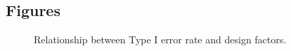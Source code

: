 \documentclass[twocolumn]{bmcart}%
\begin{document}
\begin{backmatter}


\section*{Figures}
  \begin{figure}[h!]
  \caption{Relationship between Type I error rate and design factors.}
      \end{figure}






\end{backmatter}
\end{document}
